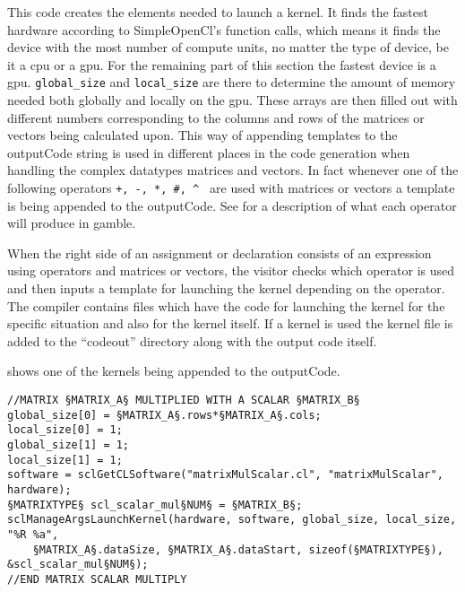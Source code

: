 This code creates the elements needed to launch a kernel.
It finds the fastest hardware according to SimpleOpenCl's function calls, which means it finds the device with the most number of compute units, no matter the type of device, be it a \acrshort{cpu} or a \acrshort{gpu}.
For the remaining part of this section the fastest device is a \acrshort{gpu}.
\texttt{global\_size} and \texttt{local\_size} are there to determine the amount of memory needed both globally and locally on the \acrshort{gpu}.
These arrays are then filled out with different numbers corresponding to the columns and rows of the matrices or vectors being calculated upon.
This way of appending templates to the outputCode string is used in different places in the code generation when handling the complex datatypes matrices and vectors.
In fact whenever one of the following operators \texttt{+, -, *, \#, \^{} } are used with matrices or vectors a template is being appended to the outputCode. 
See  for a description of what each operator will produce in \gls{gamble}.

When the right side of an assignment or declaration consists of an expression using operators and matrices or vectors, the visitor checks which operator is used and then inputs a template for launching the kernel depending on the operator.
The compiler contains files which have the code for launching the kernel for the specific situation and also for the kernel itself.
If a kernel is used the kernel file is added to the ``codeout'' directory along with the output code itself.

 shows one of the kernels being appended to the outputCode.

\begin{lstlisting}[caption=SimpleOpenCL launch of a kernel calculating a matrix or vector multiplied with a scalar.,numbers=none,frame=tlrb,label={lst:kernelLaunch}]
//MATRIX §MATRIX_A§ MULTIPLIED WITH A SCALAR §MATRIX_B§
global_size[0] = §MATRIX_A§.rows*§MATRIX_A§.cols;
local_size[0] = 1;
global_size[1] = 1;
local_size[1] = 1;
software = sclGetCLSoftware("matrixMulScalar.cl", "matrixMulScalar", hardware);
§MATRIXTYPE§ scl_scalar_mul§NUM§ = §MATRIX_B§;
sclManageArgsLaunchKernel(hardware, software, global_size, local_size, "%R %a",
    §MATRIX_A§.dataSize, §MATRIX_A§.dataStart, sizeof(§MATRIXTYPE§), &scl_scalar_mul§NUM§);
//END MATRIX SCALAR MULTIPLY
\end{lstlisting}

